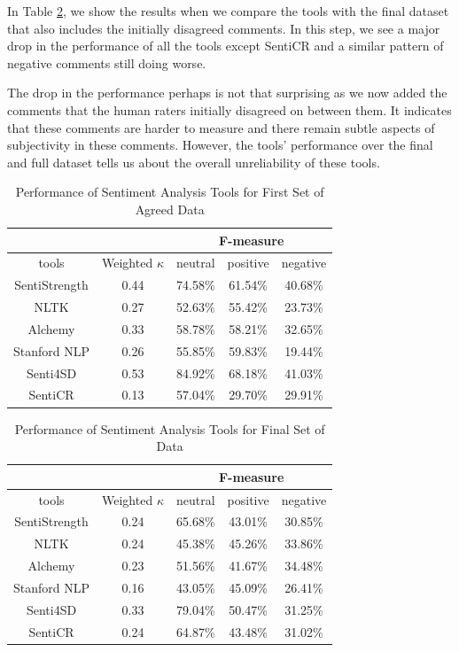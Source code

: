 In Table \ref{sentfinal}, we show the results when we compare the tools with the final dataset that also includes the initially disagreed comments. In this step, 
we see a major drop in the performance 
of all the tools 
except SentiCR
and a similar pattern of negative comments still doing worse.

The drop in the performance perhaps is not that surprising as we now added the comments that the human raters initially disagreed on between them. It indicates that these comments are harder to measure and there remain subtle aspects of subjectivity in these comments. However, the tools' performance over the final and full dataset tells us about the overall unreliability of these tools.


\vspace{3mm}
\noindent{}

\begin{table}
\centering
\caption{Performance of Sentiment Analysis Tools for First Set of  Agreed Data}
\label{sentfirst}
\begin{tabular}{|c|c|c|c|c|}
\hline
\multicolumn{2}{|c|}{ } & \multicolumn{3}{c|}{ F-measure } \\
\hline
tools & Weighted $\kappa$ & neutral & positive & negative \\
\hline
SentiStrength & 0.44 & 74.58\% & 61.54\% & 40.68\% \\
\hline
NLTK & 0.27 & 52.63\% & 55.42\% & 23.73\% \\
\hline
Alchemy & 0.33 & 58.78\% & 58.21\% & 32.65\% \\
\hline
Stanford NLP & 0.26 & 55.85\% & 59.83\% & 19.44\% \\
\hline
Senti4SD & 0.53 & 84.92\% & 68.18\% & 41.03\% \\
\hline
SentiCR & 0.13 & 57.04\% & 29.70\% & 29.91\% \\
\hline
\end{tabular}
\end{table}

\begin{table}
\centering
\caption{Performance of Sentiment Analysis Tools for Final Set of Data}
\label{sentfinal}
\begin{tabular}{|c|c|c|c|c|}
\hline
\multicolumn{2}{|c|}{ } & \multicolumn{3}{c|}{ F-measure } \\
\hline
tools & Weighted $\kappa$ & neutral & positive & negative \\
\hline
SentiStrength & 0.24 & 65.68\% & 43.01\% & 30.85\% \\
\hline
NLTK & 0.24 & 45.38\% & 45.26\% & 33.86\% \\
\hline
Alchemy & 0.23 & 51.56\% & 41.67\% & 34.48\% \\
\hline
Stanford NLP & 0.16 & 43.05\% & 45.09\% & 26.41\% \\
\hline
Senti4SD & 0.33 & 79.04\% & 50.47\% &  31.25\% \\
\hline
SentiCR & 0.24 & 64.87\% & 43.48\% & 31.02\% \\
\hline
\end{tabular}
\end{table}

